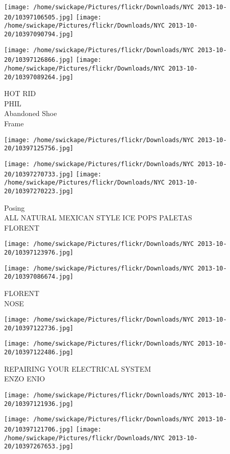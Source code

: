 \documentclass[10pt,letterpaper]{article}
\begin{document}
\texttt{[image: /home/swickape/Pictures/flickr/Downloads/NYC 2013-10-20/10397106505.jpg]}
\texttt{[image: /home/swickape/Pictures/flickr/Downloads/NYC 2013-10-20/10397090794.jpg]}

\texttt{[image: /home/swickape/Pictures/flickr/Downloads/NYC 2013-10-20/10397126866.jpg]}
\texttt{[image: /home/swickape/Pictures/flickr/Downloads/NYC 2013-10-20/10397089264.jpg]}

HOT RID\\
PHIL\\
Abandoned Shoe\\
Frame
\pagebreak

\texttt{[image: /home/swickape/Pictures/flickr/Downloads/NYC 2013-10-20/10397125756.jpg]}

\vspace{0.25in}
\texttt{[image: /home/swickape/Pictures/flickr/Downloads/NYC 2013-10-20/10397270733.jpg]}
\texttt{[image: /home/swickape/Pictures/flickr/Downloads/NYC 2013-10-20/10397270223.jpg]}

Posing\\
ALL NATURAL MEXICAN STYLE ICE POPS PALETAS\\
FLORENT
\pagebreak

\texttt{[image: /home/swickape/Pictures/flickr/Downloads/NYC 2013-10-20/10397123976.jpg]}

\vspace{0.25in}
\texttt{[image: /home/swickape/Pictures/flickr/Downloads/NYC 2013-10-20/10397086674.jpg]}

FLORENT\\
NOSE
\pagebreak

\texttt{[image: /home/swickape/Pictures/flickr/Downloads/NYC 2013-10-20/10397122736.jpg]}

\vspace{0.25in}
\texttt{[image: /home/swickape/Pictures/flickr/Downloads/NYC 2013-10-20/10397122486.jpg]}

REPAIRING YOUR ELECTRICAL SYSTEM\\
ENZO ENIO
\pagebreak

\texttt{[image: /home/swickape/Pictures/flickr/Downloads/NYC 2013-10-20/10397121936.jpg]}

\vspace{0.25in}
\texttt{[image: /home/swickape/Pictures/flickr/Downloads/NYC 2013-10-20/10397121706.jpg]}
\texttt{[image: /home/swickape/Pictures/flickr/Downloads/NYC 2013-10-20/10397267653.jpg]}
\end{document}
